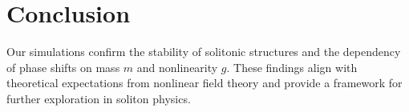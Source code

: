 \documentclass{article}
\begin{document}
\section{Conclusion}
Our simulations confirm the stability of solitonic structures and the dependency of phase shifts on mass \( m \) and nonlinearity \( g \). These findings align with theoretical expectations from nonlinear field theory and provide a framework for further exploration in soliton physics.
\end{document}
